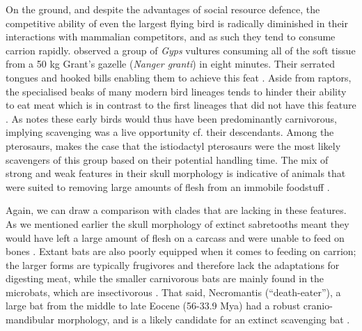\documentclass[a4paper,12pt]{article}
\begin{document}
On the ground, and despite the advantages of social resource defence, the competitive ability of even the largest flying bird is radically diminished in their interactions with mammalian competitors, and as such they tend to consume carrion rapidly. 
\cite{houston1974role} observed a group of \textit{Gyps} vultures consuming all of the soft tissue from a 50 kg Grant’s gazelle (\textit{Nanger granti}) in eight minutes. 
Their serrated tongues and hooked bills enabling them to achieve this feat \citep{houston1975digestive}. 
Aside from raptors, the specialised beaks of many modern bird lineages tends to hinder their ability to eat meat which is in contrast to the first lineages that did not have this feature \citep{martyniuk2012field}. 
As \cite{martyniuk2012field} notes these early birds would thus have been predominantly carnivorous, implying scavenging was a live opportunity cf. their descendants. 
Among the pterosaurs, \cite{witton2013pterosaurs} makes the case that the istiodactyl pterosaurs were the most likely scavengers of this group based on their potential handling time. 
The mix of strong and weak features in their skull morphology is indicative of animals that were suited to removing large amounts of flesh from an immobile foodstuff \citep{witton2013pterosaurs}. 

Again, we can draw a comparison with clades that are lacking in these features. 
As we mentioned earlier the skull morphology of extinct sabretooths meant they would have left a large amount of flesh on a carcass and were unable to feed on bones \citep{palmqvist2011giant}. 
Extant bats are also poorly equipped when it comes to feeding on carrion; the larger forms are typically frugivores and therefore lack the adaptations for digesting meat, while the smaller carnivorous bats are mainly found in the microbats, which are insectivorous \citep{aguirre2003implications}.   
That said, Necromantis (“death-eater”), a large bat from the middle to late Eocene (56-33.9 Mya) had a robust cranio-mandibular morphology, and is a likely candidate for an extinct scavenging bat \citep{Weithofer_Necromantis_1887,Hand_Necromantis_2012}.


\end{document}

